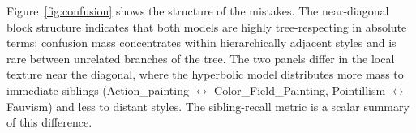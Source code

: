 Figure~\ref{fig:confusion} shows the structure of the mistakes. The
near-diagonal block structure indicates that both models are highly
tree-respecting in absolute terms: confusion mass concentrates within
hierarchically adjacent styles and is rare between unrelated branches
of the tree. The two panels differ in the local texture near the
diagonal, where the hyperbolic model distributes more mass to
immediate siblings (Action\_painting $\leftrightarrow$
Color\_Field\_Painting, Pointillism $\leftrightarrow$ Fauvism) and
less to distant styles. The sibling-recall metric is a scalar summary
of this difference.
